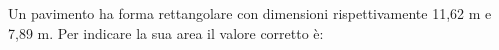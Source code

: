 Un pavimento ha forma rettangolare con dimensioni 
rispettivamente 11,62 m e 7,89 m. 
Per indicare la sua area il valore corretto è: